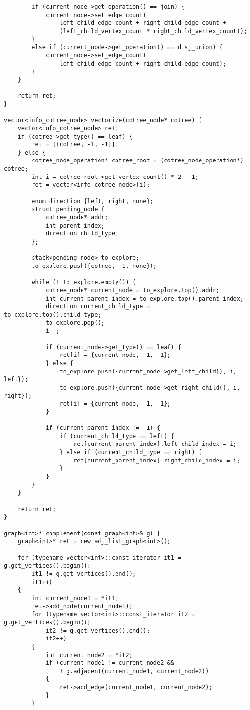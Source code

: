 \begin{lstlisting}
        if (current_node->get_operation() == join) {
            current_node->set_edge_count(
                left_child_edge_count + right_child_edge_count +
                (left_child_vertex_count * right_child_vertex_count));
        }
        else if (current_node->get_operation() == disj_union) {
            current_node->set_edge_count(
                left_child_edge_count + right_child_edge_count);
        }
    }

    return ret;
}

vector<info_cotree_node> vectorize(cotree_node* cotree) {
    vector<info_cotree_node> ret;
    if (cotree->get_type() == leaf) {
        ret = {{cotree, -1, -1}};
    } else {
        cotree_node_operation* cotree_root = (cotree_node_operation*) cotree;
        int i = cotree_root->get_vertex_count() * 2 - 1;
        ret = vector<info_cotree_node>(i);

        enum direction {left, right, none};
        struct pending_node {
            cotree_node* addr;
            int parent_index;
            direction child_type;
        };

        stack<pending_node> to_explore;
        to_explore.push({cotree, -1, none});

        while (! to_explore.empty()) {
            cotree_node* current_node = to_explore.top().addr;
            int current_parent_index = to_explore.top().parent_index;
            direction current_child_type = to_explore.top().child_type;
            to_explore.pop();
            i--;

            if (current_node->get_type() == leaf) {
                ret[i] = {current_node, -1, -1};
            } else {
                to_explore.push({current_node->get_left_child(), i, left});
                to_explore.push({current_node->get_right_child(), i, right});
                ret[i] = {current_node, -1, -1};
            }

            if (current_parent_index != -1) {
                if (current_child_type == left) {
                    ret[current_parent_index].left_child_index = i;
                } else if (current_child_type == right) {
                    ret[current_parent_index].right_child_index = i;
                }
            }
        }
    }

    return ret;
}

graph<int>* complement(const graph<int>& g) {
    graph<int>* ret = new adj_list_graph<int>();

    for (typename vector<int>::const_iterator it1 = g.get_vertices().begin();
        it1 != g.get_vertices().end();
        it1++)
    {
        int current_node1 = *it1;
        ret->add_node(current_node1);
        for (typename vector<int>::const_iterator it2 = g.get_vertices().begin();
            it2 != g.get_vertices().end();
            it2++)
        {
            int current_node2 = *it2;
            if (current_node1 != current_node2 &&
                ! g.adjacent(current_node1, current_node2))
            {
                ret->add_edge(current_node1, current_node2);
            }
        }


\end{lstlisting}
